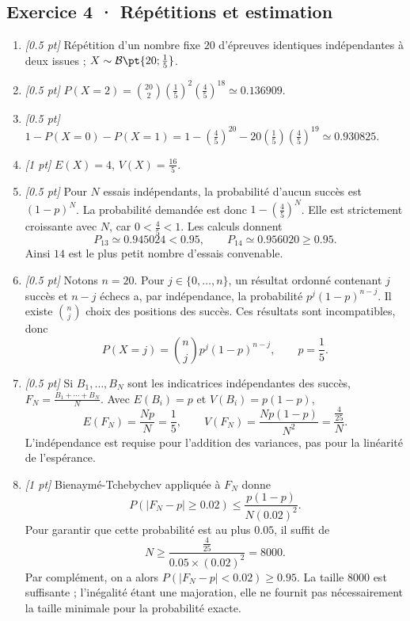 \subsection*{Exercice 4 · Répétitions et estimation}\begin{enumerate}

\item \textit{[\num{0,5} pt]} Répétition d'un nombre fixe $20$ d'épreuves identiques indépendantes à deux issues ; $X\sim\mathcal B\pt{20;\frac{1}{5}}$.

\item \textit{[\num{0,5} pt]} $P(X=2)=\binom{20}2(\frac{1}{5})^2(\frac{4}{5})^{18}\simeq\num{0,136909}$.

\item \textit{[\num{0,5} pt]} $1-P(X=0)-P(X=1)=1-(\frac{4}{5})^{20}-20(\frac{1}{5})(\frac{4}{5})^{19}\simeq\num{0,930825}$.

\item \textit{[1 pt]} $E(X)=4$, $V(X)=\frac{16}{5}$.

\item \textit{[\num{0,5} pt]} Pour $N$ essais indépendants, la probabilité d'aucun succès est $(1-p)^N$. La probabilité demandée est donc $1-(\frac{4}{5})^N$. Elle est strictement croissante avec $N$, car $0<\frac{4}{5}<1$. Les calculs donnent
\[P_{13}\simeq\num{0,945024}<\num{0,95},\qquad P_{14}\simeq\num{0,956020}\ge\num{0,95}.\]
Ainsi $14$ est le plus petit nombre d'essais convenable.

\item \textit{[\num{0,5} pt]} Notons $n=20$. Pour $j\in\{0,\ldots,n\}$, un résultat ordonné contenant $j$ succès et $n-j$ échecs a, par indépendance, la probabilité $p^j(1-p)^{n-j}$. Il existe $\binom nj$ choix des positions des succès. Ces résultats sont incompatibles, donc
\[P(X=j)=\binom nj p^j(1-p)^{n-j},\qquad p=\frac{1}{5}.\]

\item \textit{[\num{0,5} pt]} Si $B_1,\ldots,B_N$ sont les indicatrices indépendantes des succès, $F_N=\frac{B_1+\cdots+B_N}{N}$. Avec $E(B_i)=p$ et $V(B_i)=p(1-p)$,
\[E(F_N)=\frac{Np}{N}=\frac{1}{5},\qquad V(F_N)=\frac{Np(1-p)}{N^2}=\frac{\frac{4}{25}}{N}.\]
L'indépendance est requise pour l'addition des variances, pas pour la linéarité de l'espérance.

\item \textit{[1 pt]} Bienaymé-Tchebychev appliquée à $F_N$ donne
\[P(|F_N-p|\ge\num{0,02})\le\frac{p(1-p)}{N(\num{0,02})^2}.\]
Pour garantir que cette probabilité est au plus $\num{0,05}$, il suffit de
\[N\ge\frac{\frac{4}{25}}{\num{0,05}\times(\num{0,02})^2}=8000.\]
Par complément, on a alors $P(|F_N-p|<\num{0,02})\ge\num{0,95}$. La taille $8000$ est suffisante ; l'inégalité étant une majoration, elle ne fournit pas nécessairement la taille minimale pour la probabilité exacte.

\end{enumerate}


